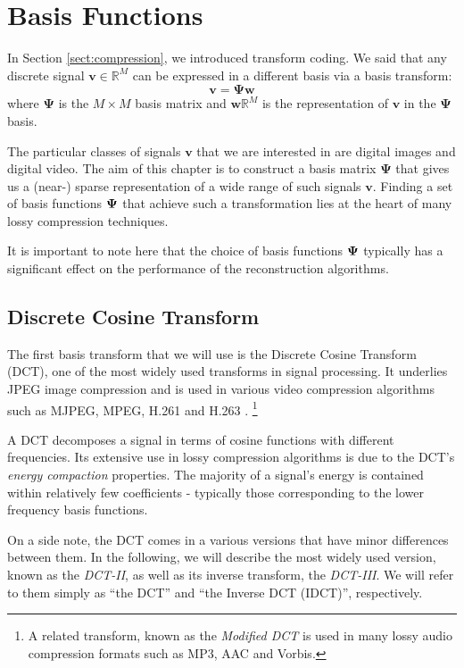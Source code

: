 \chapter{Basis Functions}
\label{ch:dwt}

In Section \ref{sect:compression}, we introduced transform coding.
We said that any discrete signal $\bm v \in \mathbb{R}^M$ can be expressed in a different basis via a basis transform:
\begin{equation*}
  \bm v = \bm\Psi\bm w
\end{equation*}
where $\bm\Psi$ is the $M\times M$ basis matrix and $\bm w \mathbb{R}^M$ is the representation of $\bm v$ in the $\bm\Psi$ basis.

The particular classes of signals $\bm v$ that we are interested in are digital images and digital video.
The aim of this chapter is to construct a basis matrix $\bm\Psi$ that gives us a (near-) sparse representation of a wide range of such signals $\bm v$.
Finding a set of basis functions $\boldsymbol\Psi$ that achieve such a transformation lies at the heart of many lossy compression techniques.

It is important to note here that the choice of basis functions $\boldsymbol \Psi$ typically has a significant effect on the performance of the reconstruction algorithms.

\section{Discrete Cosine Transform}
The first basis transform that we will use is the Discrete Cosine Transform (DCT), one of the most widely used transforms in signal processing.
It underlies JPEG image compression and is used in various video compression algorithms such as MJPEG, MPEG, H.261 and H.263 \cite{zeng2013}.
\footnote{A related transform, known as the \emph{Modified DCT} is used in many lossy audio compression formats such as MP3, AAC and Vorbis.}

A DCT decomposes a signal in terms of cosine functions with different frequencies.
Its extensive use in lossy compression algorithms is due to the DCT's \emph{energy compaction} properties.
The majority of a signal's energy is contained within relatively few coefficients - typically those corresponding to the lower frequency basis functions.

On a side note, the DCT comes in a various versions that have minor differences between them.
In the following, we will describe the most widely used version, known as the \emph{DCT-II}, as well as its inverse transform, the \emph{DCT-III}.
We will refer to them simply as ``the DCT'' and ``the Inverse DCT (IDCT)'', respectively.

